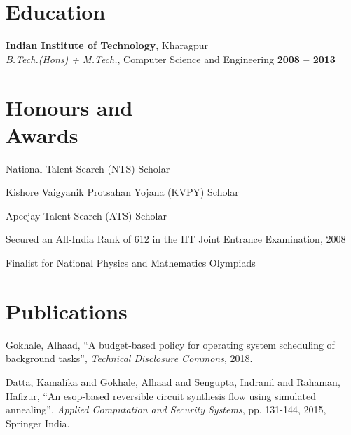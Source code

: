 \documentclass[margin,line]{resume}
\begin{document}
\begin{resume}
    \section{\mysidestyle Education}

    \textbf{Indian Institute of Technology}, Kharagpur \vspace{2mm}\\\vspace{1mm}%
    \textsl{B.Tech.(Hons) + M.Tech.}, Computer Science and Engineering \hfill \textbf{ 2008 -- 2013}\vspace{-3mm}\\\vspace{-1mm}%

    \section{\mysidestyle Honours and\\Awards} 

    \begin{list2}
        \item National Talent Search (NTS) Scholar
        \item Kishore Vaigyanik Protsahan Yojana (KVPY) Scholar
        \item Apeejay Talent Search (ATS) Scholar
        \item Secured an All-India Rank of 612 in the IIT Joint Entrance Examination, 2008
        \item Finalist for National Physics and Mathematics Olympiads
    \end{list2}\vspace{-1.5mm}


    \section{\mysidestyle Publications}

    Gokhale, Alhaad, ``A budget-based policy for operating system scheduling of background tasks'',
    \textsl{Technical Disclosure Commons}, 2018.

\vspace{-2mm}
    Datta, Kamalika and Gokhale, Alhaad and Sengupta, Indranil and Rahaman, Hafizur, 
    ``An esop-based reversible circuit synthesis flow using simulated annealing'',
    \textsl{Applied Computation and Security Systems}, pp. 131-144, 2015, Springer India.


\end{resume}
\end{document}
